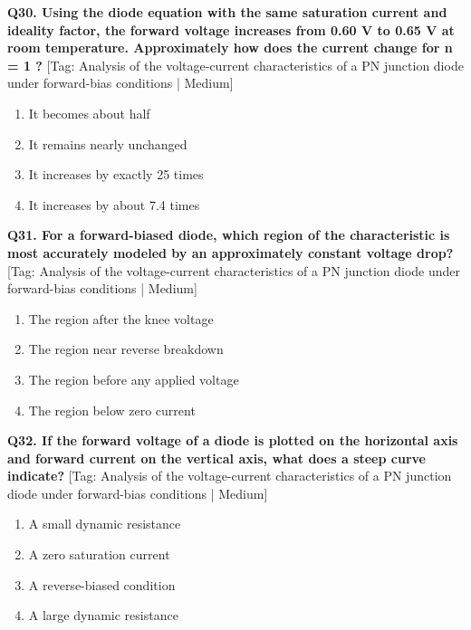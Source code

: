 \noindent\textbf{Q30. Using the diode equation with the same saturation current and ideality factor, the forward voltage increases from 0.60 V to 0.65 V at room temperature. Approximately how does the current change for n = 1 ?} \hfill [Tag: Analysis of the voltage-current characteristics of a PN junction diode under forward-bias conditions | Medium]
\begin{enumerate}[label=(\alph*),topsep=2pt,itemsep=1pt,partopsep=0pt,parsep=0pt]
    \item {It becomes about half}
    \item {It remains nearly unchanged}
    \item {It increases by exactly 25 times}
    \item {It increases by about 7.4 times}
\end{enumerate}
\vspace{2mm}

\noindent\textbf{Q31. For a forward-biased diode, which region of the characteristic is most accurately modeled by an approximately constant voltage drop?} \hfill [Tag: Analysis of the voltage-current characteristics of a PN junction diode under forward-bias conditions | Medium]
\begin{enumerate}[label=(\alph*),topsep=2pt,itemsep=1pt,partopsep=0pt,parsep=0pt]
    \item {The region after the knee voltage}
    \item {The region near reverse breakdown}
    \item {The region before any applied voltage}
    \item {The region below zero current}
\end{enumerate}
\vspace{2mm}

\noindent\textbf{Q32. If the forward voltage of a diode is plotted on the horizontal axis and forward current on the vertical axis, what does a steep curve indicate?} \hfill [Tag: Analysis of the voltage-current characteristics of a PN junction diode under forward-bias conditions | Medium]
\begin{enumerate}[label=(\alph*),topsep=2pt,itemsep=1pt,partopsep=0pt,parsep=0pt]
    \item {A small dynamic resistance}
    \item {A zero saturation current}
    \item {A reverse-biased condition}
    \item {A large dynamic resistance}
\end{enumerate}
\vspace{2mm}

